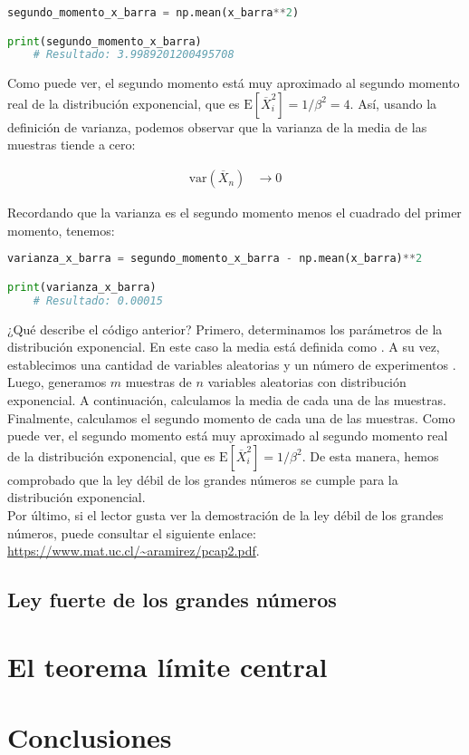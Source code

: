 \documentclass[8pt]{article}
\newcommand{\code}[1]{\texttt{\color{frenchplum}{#1}}}
\begin{document}
\begin{lstlisting}[language=Python]
segundo_momento_x_barra = np.mean(x_barra**2)

print(segundo_momento_x_barra)
    # Resultado: 3.9989201200495708
\end{lstlisting}

Como puede ver, el segundo momento está muy aproximado al segundo momento real de la distribución exponencial, que es $\text{E}[\overline{X}^2_i] = 1/\beta^2 = 4$. Así, usando la definición de varianza, podemos observar que la varianza de la media de las muestras tiende a cero:

\begin{align*}
    \text{var}(\overline{X}_n) &\longrightarrow 0
\end{align*}

Recordando que la varianza es el segundo momento menos el cuadrado del primer momento, tenemos:

\begin{lstlisting}[language=Python]
varianza_x_barra = segundo_momento_x_barra - np.mean(x_barra)**2

print(varianza_x_barra)
    # Resultado: 0.00015
\end{lstlisting}

\vspace*{0.3cm}

¿Qué describe el código anterior? Primero, determinamos los parámetros de la distribución exponencial. En este caso la media está definida como \code{media\_exp = 2}. A su vez, establecimos una cantidad de variables aleatorias \code{n = 10000} y un número de experimentos \code{m = 500}. Luego, generamos $m$ muestras de $n$ variables aleatorias con distribución exponencial. A continuación, calculamos la media de cada una de las muestras. Finalmente, calculamos el segundo momento de cada una de las muestras. Como puede ver, el segundo momento está muy aproximado al segundo momento real de la distribución exponencial, que es $\text{E}[\overline{X}^2_i] = 1/\beta^2$. De esta manera, hemos comprobado que la ley débil de los grandes números se cumple para la distribución exponencial.\\

Por último, si el lector gusta ver la demostración de la ley débil de los grandes números, puede consultar el siguiente enlace: \url{https://www.mat.uc.cl/~aramirez/pcap2.pdf}.



\subsection{Ley fuerte de los grandes números}




\section{El teorema límite central}




\section{Conclusiones}
\end{document}
